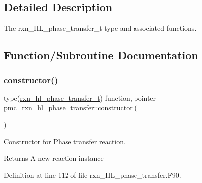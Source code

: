 \subsection{Detailed Description}
The rxn\+\_\+\+H\+L\+\_\+phase\+\_\+transfer\+\_\+t type and associated functions. 

\subsection{Function/\+Subroutine Documentation}
\mbox{\label{namespacepmc__rxn__hl__phase__transfer_a1d307b730caaec01f18e464b315042a1}} 
\subsubsection{\texorpdfstring{constructor()}{constructor()}}
{\footnotesize\ttfamily type(\mbox{\hyperlink{structpmc__rxn__hl__phase__transfer_1_1rxn__hl__phase__transfer__t}{rxn\+\_\+hl\+\_\+phase\+\_\+transfer\+\_\+t}}) function, pointer pmc\+\_\+rxn\+\_\+hl\+\_\+phase\+\_\+transfer\+::constructor (\begin{DoxyParamCaption}{ }\end{DoxyParamCaption})\hspace{0.3cm}{\ttfamily [private]}}



Constructor for Phase transfer reaction. 

\begin{DoxyReturn}{Returns}
A new reaction instance 
\end{DoxyReturn}


Definition at line 112 of file rxn\+\_\+\+H\+L\+\_\+phase\+\_\+transfer.\+F90.

\mbox{\label{namespacepmc__rxn__hl__phase__transfer_a0a981521812601400c9e9d40e803e40e}} 
